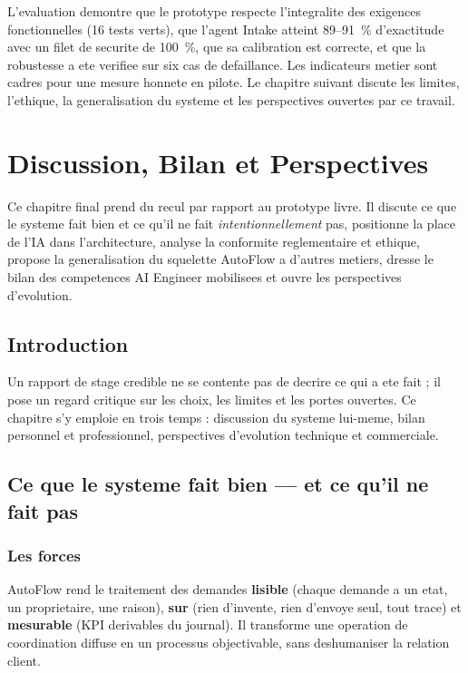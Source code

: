 \documentclass[12pt,a4paper,openany]{report}
\begin{document}
L'evaluation demontre que le prototype respecte l'integralite des exigences fonctionnelles (16 tests verts), que l'agent Intake atteint 89--91~\% d'exactitude avec un filet de securite de 100~\%, que sa calibration est correcte, et que la robustesse a ete verifiee sur six cas de defaillance. Les indicateurs metier sont cadres pour une mesure honnete en pilote. Le chapitre suivant discute les limites, l'ethique, la generalisation du systeme et les perspectives ouvertes par ce travail.

\chapter{Discussion, Bilan et Perspectives}\label{chap:discussion}
Ce chapitre final prend du recul par rapport au prototype livre. Il discute ce que le systeme fait bien et ce qu'il ne fait \emph{intentionnellement} pas, positionne la place de l'IA dans l'architecture, analyse la conformite reglementaire et ethique, propose la generalisation du squelette AutoFlow a d'autres metiers, dresse le bilan des competences AI Engineer mobilisees et ouvre les perspectives d'evolution.

\section{Introduction}
Un rapport de stage credible ne se contente pas de decrire ce qui a ete fait ; il pose un regard critique sur les choix, les limites et les portes ouvertes. Ce chapitre s'y emploie en trois temps : discussion du systeme lui-meme, bilan personnel et professionnel, perspectives d'evolution technique et commerciale.

\section{Ce que le systeme fait bien --- et ce qu'il ne fait pas}

\subsection{Les forces}
AutoFlow rend le traitement des demandes \textbf{lisible} (chaque demande a un etat, un proprietaire, une raison), \textbf{sur} (rien d'invente, rien d'envoye seul, tout trace) et \textbf{mesurable} (KPI derivables du journal). Il transforme une operation de coordination diffuse en un processus objectivable, sans deshumaniser la relation client.
\end{document}
